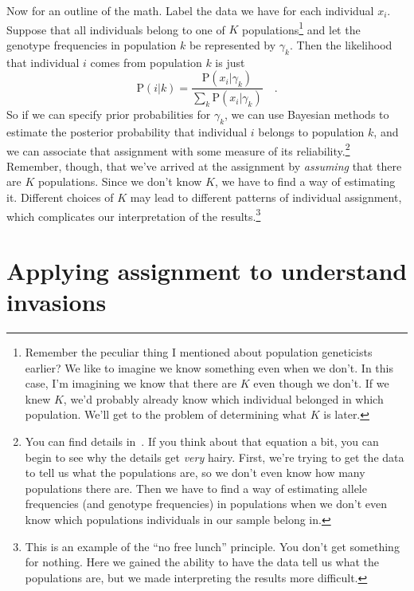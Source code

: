 Now for an outline of the math. Label the data we have for each
individual $x_i$. Suppose that all individuals belong to one of $K$
populations\footnote{Remember the peculiar thing I mentioned about
  population geneticists earlier? We like to imagine we know something
  even when we don't. In this case, I'm imagining we know that there
  are $K$ even though we don't. If we knew $K$, we'd probably already
  know which individual belonged in which population. We'll get to the
  problem of determining what $K$ is later.} and let the genotype
frequencies in population $k$ be represented by $\gamma_k$. Then the
likelihood that individual $i$ comes from population $k$ is just
\[
\mbox{P}(i|k) = \frac{\mbox{P}(x_i|\gamma_k)}{\sum_k
  \mbox{P}(x_i|\gamma_k)} \quad .
\]
So if we can specify prior probabilities for $\gamma_k$, we can use
Bayesian methods to estimate the posterior probability that individual
$i$ belongs to population $k$, and we can associate that assignment
with some measure of its reliability.\footnote{You can find details
  in~\cite{Pritchard-etal-2000}. If you think about that equation a
  bit, you can begin to see why the details get {\it very\/}
  hairy. First, we're trying to get the data to tell us what the
  populations are, so we don't even know how many populations there
  are. Then we have to find a way of estimating allele frequencies
  (and genotype frequencies) in populations when we don't even know
  which populations individuals in our sample belong in.}  Remember,
though, that we've arrived at the assignment by {\it assuming\/} that
there are $K$ populations. Since we don't know $K$, we have to find a
way of estimating it. Different choices of $K$ may lead to different
patterns of individual assignment, which complicates our
interpretation of the results.\footnote{This is an example of the ``no
  free lunch'' principle. You don't get something for nothing. Here we
  gained the ability to have the data tell us what the populations
  are, but we made interpreting the results more difficult.}

\section*{Applying assignment to understand invasions}

